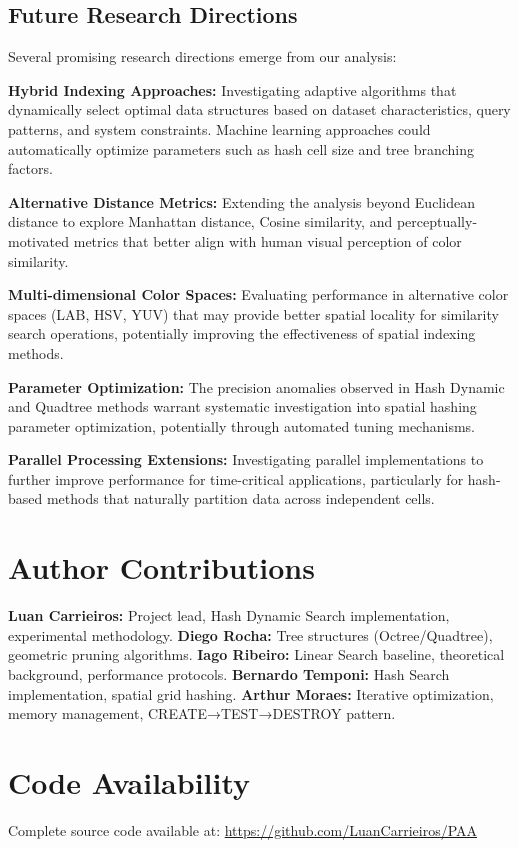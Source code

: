 \documentclass{sbc2023}
\begin{document}
\subsection{Future Research Directions}

Several promising research directions emerge from our analysis:

\textbf{Hybrid Indexing Approaches:} Investigating adaptive algorithms that dynamically select optimal data structures based on dataset characteristics, query patterns, and system constraints. Machine learning approaches could automatically optimize parameters such as hash cell size and tree branching factors.

\textbf{Alternative Distance Metrics:} Extending the analysis beyond Euclidean distance to explore Manhattan distance, Cosine similarity, and perceptually-motivated metrics that better align with human visual perception of color similarity.

\textbf{Multi-dimensional Color Spaces:} Evaluating performance in alternative color spaces (LAB, HSV, YUV) that may provide better spatial locality for similarity search operations, potentially improving the effectiveness of spatial indexing methods.

\textbf{Parameter Optimization:} The precision anomalies observed in Hash Dynamic and Quadtree methods warrant systematic investigation into spatial hashing parameter optimization, potentially through automated tuning mechanisms.

\textbf{Parallel Processing Extensions:} Investigating parallel implementations to further improve performance for time-critical applications, particularly for hash-based methods that naturally partition data across independent cells.


\section*{Author Contributions}
\textbf{Luan Carrieiros:} Project lead, Hash Dynamic Search implementation, experimental methodology. \textbf{Diego Rocha:} Tree structures (Octree/Quadtree), geometric pruning algorithms. \textbf{Iago Ribeiro:} Linear Search baseline, theoretical background, performance protocols. \textbf{Bernardo Temponi:} Hash Search implementation, spatial grid hashing. \textbf{Arthur Moraes:} Iterative optimization, memory management, CREATE→TEST→DESTROY pattern.

\section*{Code Availability}
Complete source code available at: \url{https://github.com/LuanCarrieiros/PAA}
\end{document}
